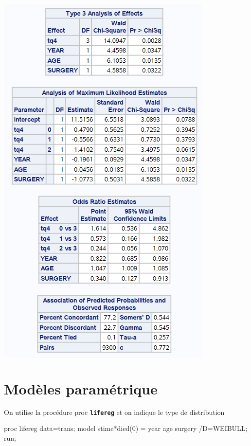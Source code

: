 \documentclass[
  12pt,
  letterpaper,
  DIV=11,
  numbers=noendperiod,
  onepage,
  openany]{scrreprt}
\newenvironment{Shaded}{\begin{snugshade}}{\end{snugshade}}
\newcommand{\DecValTok}[1]{\textcolor[rgb]{0.86,0.86,0.80}{#1}}
\newcommand{\FunctionTok}[1]{\textcolor[rgb]{0.94,0.94,0.56}{#1}}
\newcommand{\NormalTok}[1]{\textcolor[rgb]{0.80,0.80,0.80}{#1}}
\newcommand{\OtherTok}[1]{\textcolor[rgb]{0.94,0.94,0.56}{#1}}
\newcommand{\SpecialCharTok}[1]{\textcolor[rgb]{0.86,0.64,0.64}{#1}}
\begin{document}
\includegraphics{sas/7d.PNG}

\hypertarget{moduxe8les-paramuxe9trique}{%
\section{Modèles paramétrique}\label{moduxe8les-paramuxe9trique}}

On utilise la procédure proc \textbf{\texttt{lifereg}} et on indique le
type de distribution

\begin{Shaded}
\begin{Highlighting}[]
\NormalTok{proc lifereg data}\OtherTok{=}\NormalTok{trans;}
\NormalTok{model stime}\SpecialCharTok{*}\FunctionTok{died}\NormalTok{(}\DecValTok{0}\NormalTok{) }\OtherTok{=}\NormalTok{ year age surgery }\SpecialCharTok{/}\NormalTok{D}\OtherTok{=}\NormalTok{WEIBULL;}
\NormalTok{run;}
\end{Highlighting}
\end{Shaded}
\end{document}

